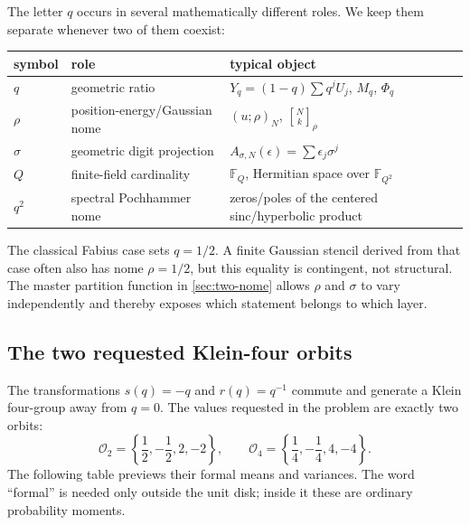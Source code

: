 \documentclass[11pt,oneside]{article}
\numberwithin{equation}{section}
\theoremstyle{definition}
\theoremstyle{remark}
\newcommand{\qbinom}[3]{\genfrac{[}{]}{0pt}{}{#1}{#2}_{#3}}
\begin{document}
The letter $q$ occurs in several mathematically different roles.  We keep them
separate whenever two of them coexist:
\begin{center}
\begin{tabularx}{0.95\textwidth}{>{\bfseries}l l X}
\toprule
symbol & role & typical object \\
\midrule
$q$ & geometric ratio & $Y_q=(1-q)\sum q^jU_j$, $M_q$, $\Phi_q$ \\
$\rho$ & position-energy/Gaussian nome & $(u;\rho)_N$, $\qbinom{N}{k}{\rho}$ \\
$\sigma$ & geometric digit projection & $A_{\sigma,N}(\epsilon)=\sum\epsilon_j\sigma^j$ \\
$Q$ & finite-field cardinality & $\mathbb F_Q$, Hermitian space over $\mathbb F_{Q^2}$ \\
$q^2$ & spectral Pochhammer nome & zeros/poles of the centered sinc/hyperbolic product \\
\bottomrule
\end{tabularx}
\end{center}
The classical Fabius case sets $q=1/2$.  A finite Gaussian stencil derived from
that case often also has nome $\rho=1/2$, but this equality is contingent, not
structural.  The master partition function in \cref{sec:two-nome} allows
$\rho$ and $\sigma$ to vary independently and thereby exposes which statement
belongs to which layer.

\subsection{The two requested Klein-four orbits}

The transformations $s(q)=-q$ and $r(q)=q^{-1}$ commute and generate a
Klein four-group away from $q=0$.  The values requested in the problem are
exactly two orbits:
\[
 \mathcal O_2=\left\{\frac12,-\frac12,2,-2\right\},
 \qquad
 \mathcal O_4=\left\{\frac14,-\frac14,4,-4\right\}.
\]
The following table previews their formal means and variances.  The word
``formal'' is needed only outside the unit disk; inside it these are ordinary
probability moments.
\end{document}
